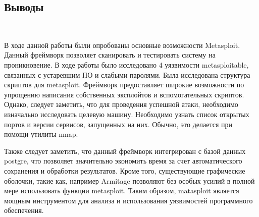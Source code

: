 \documentclass{article}
\begin{document}
\subsection{Выводы}
~

В ходе данной работы были опробованы основные возможности Metasploit. Данный фреймворк позволяет сканировать и тестировать систему на проникновение. В ходе работы было исследовано 4 уязвимости metasploitable, связанных с устаревшим ПО и слабыми паролями. Была исследована структура скриптов для metasploit. Фреймворк предоставляет широкие возможности по упрощению написания собственных эксплойтов и вспомогательных скриптов. Однако, следует заметить, что для проведения успешной атаки, необходимо изначально исследовать целевую машину. Необходимо узнать список открытых портов и версии сервисов, запущенных на них. Обычно, это делается при помощи утилиты nmap. 

Также следует заметить, что данный фреймворк интегрирован с базой данных postgre, что позволяет значительно экономить время за счет автоматического сохранения и обработки результатов. Кроме того, существующие графические оболочки, такие как, например Armitage позволяют без особых усилий в полной мере использовать функции metasploit. Таким образом, matasploit является мощным инструментом для анализа и использования уязвимостей программного обеспечения.
 
\end{document}
